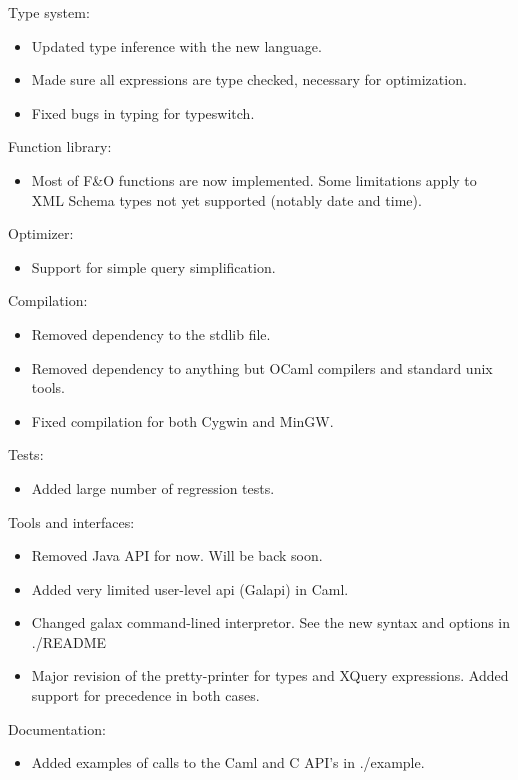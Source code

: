 Type system:
\begin{itemize}
\item Updated type inference with the new language.
\item Made sure all expressions are type checked, necessary for
  optimization.
\item Fixed bugs in typing for typeswitch.
\end{itemize}

Function library:
\begin{itemize}
\item Most of F\&O functions are now implemented. Some limitations apply to
  XML Schema types not yet supported (notably date and time).
\end{itemize}

Optimizer:
\begin{itemize}
\item Support for simple query simplification.
\end{itemize}

Compilation:
\begin{itemize}
\item Removed dependency to the stdlib file.
\item Removed dependency to anything but OCaml compilers and standard unix
  tools.
\item Fixed compilation for both Cygwin and MinGW.
\end{itemize}

Tests:
\begin{itemize}
\item Added large number of regression tests.
\end{itemize}

Tools and interfaces:
\begin{itemize}
\item Removed Java API for now. Will be back soon.
\item Added very limited user-level api (Galapi) in Caml.
\item Changed galax command-lined interpretor. See the new syntax and
  options in ./README
\item Major revision of the pretty-printer for types and XQuery
  expressions. Added support for precedence in both cases.
\end{itemize}

Documentation:
\begin{itemize}
\item Added examples of calls to the Caml and C API's in ./example.
\end{itemize}

